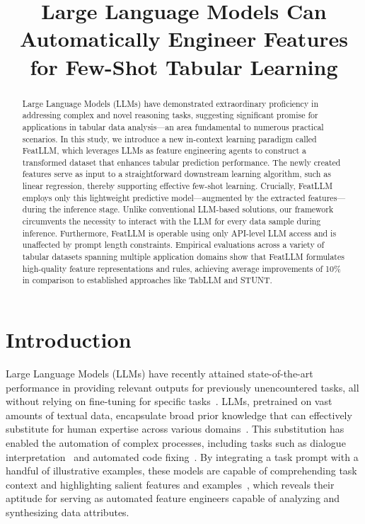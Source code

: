 \title{Large Language Models Can Automatically Engineer Features for Few-Shot Tabular Learning}

\begin{abstract}
Large Language Models (LLMs) have demonstrated extraordinary proficiency in addressing complex and novel reasoning tasks, suggesting significant promise for applications in tabular data analysis—an area fundamental to numerous practical scenarios. In this study, we introduce a new in-context learning paradigm called \textsf{FeatLLM}, which leverages LLMs as feature engineering agents to construct a transformed dataset that enhances tabular prediction performance. The newly created features serve as input to a straightforward downstream learning algorithm, such as linear regression, thereby supporting effective few-shot learning. Crucially, \textsf{FeatLLM} employs only this lightweight predictive model—augmented by the extracted features—during the inference stage. Unlike conventional LLM-based solutions, our framework circumvents the necessity to interact with the LLM for every data sample during inference. Furthermore, \textsf{FeatLLM} is operable using only API-level LLM access and is unaffected by prompt length constraints. Empirical evaluations across a variety of tabular datasets spanning multiple application domains show that \textsf{FeatLLM} formulates high-quality feature representations and rules, achieving average improvements of 10\% in comparison to established approaches like TabLLM and STUNT.
\end{abstract}

\section{Introduction}
Large Language Models (LLMs) have recently attained state-of-the-art performance in providing relevant outputs for previously unencountered tasks, all without relying on fine-tuning for specific tasks~\cite{creswell2022selection,imani2023mathprompter,taylor2022galactica}. LLMs, pretrained on vast amounts of textual data, encapsulate broad prior knowledge that can effectively substitute for human expertise across various domains~\cite{Genomes2021,singhal2023large,wilcox2003role}. This substitution has enabled the automation of complex processes, including tasks such as dialogue interpretation~\cite{finch2023leveraging} and automated code fixing~\cite{fan2023automated}. By integrating a task prompt with a handful of illustrative examples, these models are capable of comprehending task context and highlighting salient features and examples~\cite{brown2020language,zhao2023survey}, which reveals their aptitude for serving as automated feature engineers capable of analyzing and synthesizing data attributes.

